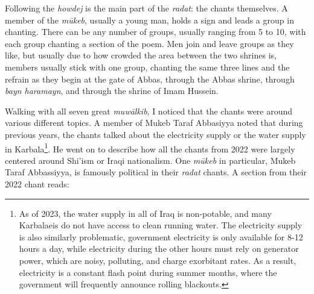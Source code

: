 


Following the \emph{howdej} is the main part of the \emph{radat}: the chants themselves. A member of the \emph{mūkeb}, usually a young man, holds a sign and leads a group in chanting. There can be any number of groups, usually ranging from 5 to 10, with each group chanting a section of the poem. Men join and leave groups as they like, but usually due to how crowded the area between the two shrines is, members usually stick with one group, chanting the same three lines and the refrain as they begin at the gate of Abbas, through the Abbas shrine, through \emph{bayn haramayn}, and through the shrine of Imam Hussein. 

Walking with all seven great \emph{muwālkib}, I noticed that the chants were around various different topics. A member of Mukeb Taraf Abbasiyya noted that during previous years, the chants talked about the electricity supply or the water supply in Karbala\footnote{As of 2023, the water supply in all of Iraq is non-potable, and many Karbalaeis do not have access to clean running water. The electricity supply is also similarly problematic, government electricity is only available for 8-12 hours a day, while electricity during the other hours must rely on generator power, which are noisy, polluting, and charge exorbitant rates. As a result, electricity is a constant flash point during summer months, where the government will frequently announce rolling blackouts.}. He went on to describe how all the chants from 2022 were largely centered around Shi'ism or Iraqi nationalism. One \emph{mūkeb} in particular, Mukeb Taraf Abbassiyya, is famously political in their \emph{radat} chants. A section from their 2022 chant reads: 



